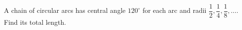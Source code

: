 A chain of circular arcs has central angle $120^\circ$ for each arc and radii $\dfrac{1}{2},\dfrac{1}{4},\dfrac{1}{8},\ldots$. Find its total length.
